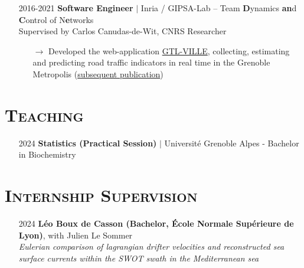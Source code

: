 \documentclass{article}
\begin{document}
\begin{itemize}
    \item[] 2016-2021 \tabto{2cm} \textbf{Software Engineer} $\vert$ Inria / GIPSA-Lab – Team \textbf{D}ynamics \textbf{an}d \textbf{C}ontrol of N\textbf{e}tworks\\[.1 cm]
    \tabto{2cm} Supervised by Carlos Canudas-de-Wit, CNRS Researcher
    \vspace{-.1cm}
    \begin{itemize}[left=2cm]
        \item[$\rightarrow$] Developed the web-application \href{https://gtlville.inrialpes.fr/}{GTL-VILLE}, collecting, estimating and predicting road traffic indicators in real time in the Grenoble Metropolis (\href{https://hal.science/hal-03694936}{subsequent publication})
    \end{itemize}
\end{itemize}

\section*{\textsc{Teaching}}
\begin{itemize}
    \item[] 2024 \tabto{2cm} \textbf{Statistics (Practical Session)} $\vert$ Université Grenoble Alpes - Bachelor in Biochemistry
\end{itemize}

\section*{\textsc{Internship Supervision}}
\begin{itemize}
    \item[] 2024 \tabto{2cm} \textbf{Léo Boux de Casson (Bachelor, École Normale Supérieure de Lyon)}, with Julien Le Sommer \\[.1 cm]
    \tabto{2cm} \textit{Eulerian comparison of lagrangian drifter velocities and reconstructed sea surface currents within the \tabto{2cm} SWOT swath in the Mediterranean sea}
\end{itemize}
\end{document}
